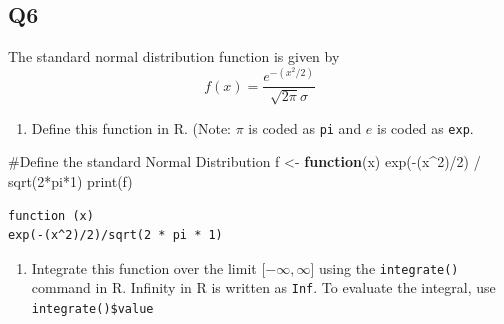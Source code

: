 \documentclass[
]{article}
\newenvironment{Shaded}{\begin{snugshade}}{\end{snugshade}}
\newcommand{\CommentTok}[1]{\textcolor[rgb]{0.37,0.37,0.37}{#1}}
\newcommand{\ControlFlowTok}[1]{\textcolor[rgb]{0.00,0.23,0.31}{\textbf{#1}}}
\newcommand{\DecValTok}[1]{\textcolor[rgb]{0.68,0.00,0.00}{#1}}
\newcommand{\FunctionTok}[1]{\textcolor[rgb]{0.28,0.35,0.67}{#1}}
\newcommand{\NormalTok}[1]{\textcolor[rgb]{0.00,0.23,0.31}{#1}}
\newcommand{\OtherTok}[1]{\textcolor[rgb]{0.00,0.23,0.31}{#1}}
\newcommand{\SpecialCharTok}[1]{\textcolor[rgb]{0.37,0.37,0.37}{#1}}
\providecommand{\tightlist}{%
  \setlength{\itemsep}{0pt}\setlength{\parskip}{0pt}}
\begin{document}
\subsection{Q6}\label{q6}

The standard normal distribution function is given by
\[f(x)=\frac{e^{-(x^2/2)}}{\sqrt{2\pi}\sigma}\]

\begin{description}
\tightlist
\item[term]
\end{description}

\begin{enumerate}
\def\labelenumi{(\alph{enumi})}
\tightlist
\item
  Define this function in R. (Note: \(\pi\) is coded as \texttt{pi} and
  \(e\) is coded as \texttt{exp}.
\end{enumerate}

\begin{tcolorbox}[enhanced jigsaw, arc=.35mm, bottomrule=.15mm, breakable, colback=white, colframe=quarto-callout-tip-color-frame, left=2mm, leftrule=.75mm, opacityback=0, rightrule=.15mm, toprule=.15mm]

\begin{Shaded}
\begin{Highlighting}[]
\CommentTok{\#Define the standard Normal Distribution}
\NormalTok{f }\OtherTok{\textless{}{-}} \ControlFlowTok{function}\NormalTok{(x)}
  \FunctionTok{exp}\NormalTok{(}\SpecialCharTok{{-}}\NormalTok{(x}\SpecialCharTok{\^{}}\DecValTok{2}\NormalTok{)}\SpecialCharTok{/}\DecValTok{2}\NormalTok{) }\SpecialCharTok{/} \FunctionTok{sqrt}\NormalTok{(}\DecValTok{2}\SpecialCharTok{*}\NormalTok{pi}\SpecialCharTok{*}\DecValTok{1}\NormalTok{)}
\FunctionTok{print}\NormalTok{(f)}
\end{Highlighting}
\end{Shaded}

\begin{verbatim}
function (x) 
exp(-(x^2)/2)/sqrt(2 * pi * 1)
\end{verbatim}

\end{tcolorbox}

\begin{enumerate}
\def\labelenumi{(\alph{enumi})}
\setcounter{enumi}{1}
\tightlist
\item
  Integrate this function over the limit {[}\(-\infty,\infty\){]} using
  the \texttt{integrate()} command in R. Infinity in R is written as
  \texttt{Inf}. To evaluate the integral, use
  \texttt{integrate()\$value}
\end{enumerate}
\end{document}
